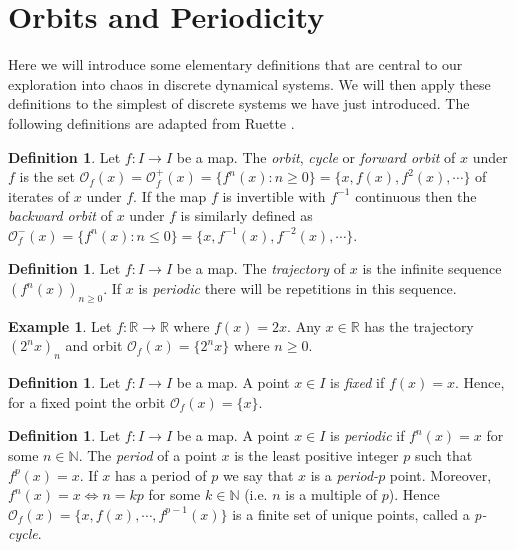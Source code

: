 \documentclass[11pt,a4paper,oneside]{memoir}
\theoremstyle{plain}
\theoremstyle{definition}
\newtheorem{defn}[thm]{Definition}
\newtheorem{exmp}[thm]{Example}
\begin{document}
\section{Orbits and Periodicity}
Here we will introduce some elementary definitions that are central to our exploration into chaos in discrete dynamical systems. We will then apply these definitions to the simplest of discrete systems we have just introduced. The following definitions are adapted from Ruette \cite[Section 1.2]{ruette}.

\begin{defn}
    Let $f: I \to I$ be a map. The \emph{orbit}, \emph{cycle} or \emph{forward orbit} of $x$ under $f$ is the set $\mathcal{O}_f(x) = \mathcal{O}^+_f(x) = \lbrace f^n(x) : n \geq 0 \rbrace = \lbrace x, f(x), f^2(x), \cdots \rbrace$ of iterates of $x$ under $f$. If the map $f$ is invertible with $f^{-1}$ continuous then the \emph{backward orbit} of $x$ under $f$ is similarly defined as $\mathcal{O}^-_f(x) = \lbrace f^n(x) : n \leq 0 \rbrace = \lbrace x, f^{-1}(x), f^{-2}(x), \cdots \rbrace$.
\end{defn}

\begin{defn}
    Let $f: I \to I$ be a map. The \emph{trajectory} of $x$ is the infinite sequence $(f^n(x))_{n \geq 0}$. If $x$ is \emph{periodic} there will be repetitions in this sequence.
\end{defn}

\begin{exmp}
    Let $f: \mathbb{R} \to \mathbb{R}$ where $f(x) = 2x$. Any $x \in \mathbb{R}$ has the trajectory $(2^nx)_n$ and orbit $\mathcal{O}_f(x) = \lbrace 2^nx \rbrace$ where $n \geq 0$.
\end{exmp}

\begin{defn}
    Let $f: I \to I$ be a map. A point $x \in I$ is \emph{fixed} if $f(x) = x$. Hence, for a fixed point the orbit $\mathcal{O}_f(x) = \lbrace x \rbrace$.
\end{defn}

\begin{defn}
    Let $f: I \to I$ be a map. A point $x \in I$ is \emph{periodic} if $f^n(x) = x$ for some $n \in \mathbb{N}$. The \emph{period} of a point $x$ is the least positive integer $p$ such that $f^p(x) = x$. If $x$ has a period of $p$ we say that $x$ is a \emph{period-$p$} point. Moreover, $f^n(x) = x \iff n = kp$ for some $k \in \mathbb{N}$ (i.e. $n$ is a multiple of $p$). Hence $\mathcal{O}_f(x) = \lbrace x, f(x), \cdots, f^{p-1}(x) \rbrace$ is a finite set of unique points, called a \emph{p-cycle}.

\end{defn}
\end{document}
